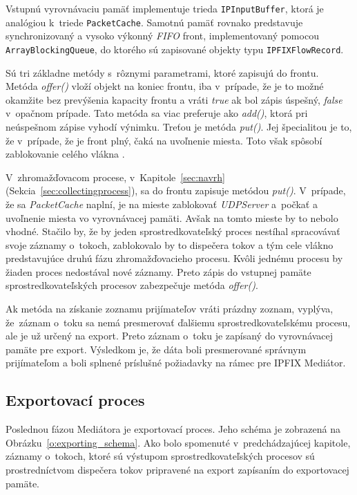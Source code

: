 Vstupnú vyrovnávaciu pamäť implementuje trieda \verb|IPInputBuffer|, ktorá je analógiou k~triede \verb|PacketCache|.
Samotnú pamäť rovnako predstavuje synchronizovaný a vysoko výkonný \emph{FIFO} front, implementovaný 
pomocou \verb|ArrayBlockingQueue|, do ktorého sú zapisované objekty typu \verb|IPFIXFlowRecord|.

Sú tri základne metódy s~rôznymi parametrami, ktoré zapisujú do frontu.
Metóda \emph{offer()} vloží objekt na koniec frontu, iba v~prípade, že je to možné 
okamžite bez prevýšenia kapacity frontu a vráti \emph{true} ak bol zápis úspešný, \emph{false}
v~opačnom prípade. Tato metóda sa viac preferuje ako \emph{add()}, ktorá pri neúspešnom zápise 
vyhodí výnimku. Treťou je metóda \emph{put()}. Jej špecialitou je to, že v~prípade, že je front plný,
čaká na uvoľnenie miesta. Toto však spôsobí zablokovanie celého vlákna \citep{arrayblockingqueue}.

V~zhromažďovacom procese, v~Kapitole~\ref{sec:navrh} (Sekcia~\ref{sec:collectingprocess}),
sa do frontu zapisuje metódou \emph{put()}. V~prípade, že sa \emph{PacketCache} naplní, je na mieste 
zablokovať \emph{UDPServer} a~počkať a uvoľnenie miesta vo vyrovnávacej pamäti. Avšak na tomto mieste by 
to nebolo vhodné. Stačilo by, že by jeden sprostredkovateľský proces nestíhal spracovávať svoje záznamy
o~tokoch, zablokovalo by to dispečera tokov a tým cele vlákno predstavujúce druhú fázu zhromažďovacieho
procesu. Kvôli jednému procesu by žiaden proces nedostával nové záznamy. Preto zápis do vstupnej pamäte
sprostredkovateľských procesov zabezpečuje metóda \emph{offer()}.

Ak metóda na získanie zoznamu prijímateľov vráti prázdny zoznam, vyplýva, že~záznam o~toku 
sa nemá presmerovať ďalšiemu sprostredkovateľskému procesu, ale je už určený na export. Preto záznam
o~toku je zapísaný do vyrovnávacej pamäte pre export. Výsledkom je, že dáta boli presmerované správnym 
prijímateľom a boli splnené príslušné požiadavky na rámec pre IPFIX Mediátor.

\subsection{Exportovací proces}

Poslednou fázou Mediátora je exportovací proces. Jeho schéma je zobrazená na 
Obrázku~\ref{o:exporting_schema}. Ako bolo spomenuté v~predchádzajúcej kapitole, záznamy 
o~tokoch, ktoré sú výstupom  sprostredkovateľských procesov sú prostredníctvom dispečera 
tokov pripravené na export zapísaním do exportovacej pamäte.

